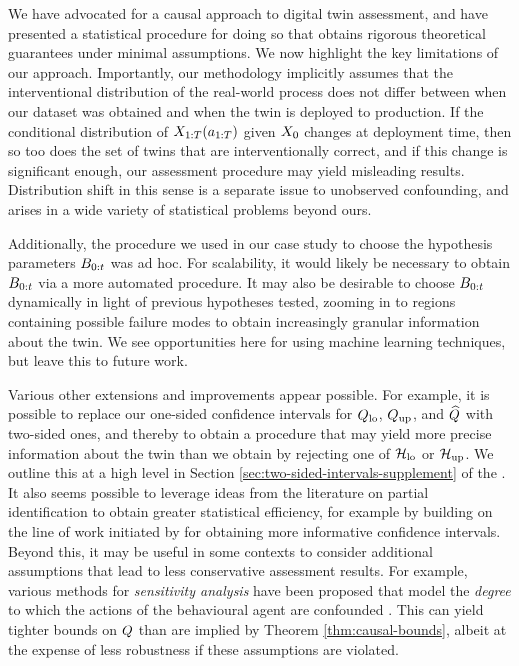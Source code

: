 We have advocated for a causal approach to digital twin assessment, and have presented a statistical procedure for doing so that obtains rigorous theoretical guarantees under minimal assumptions.
We now highlight the key limitations of our approach.
Importantly, our methodology implicitly assumes that the interventional distribution of the real-world process does not differ between when our dataset was obtained and when the twin is deployed to production. %
%
If the conditional distribution of $X_{1:T}(a_{1:T})$ given $X_0$ changes at deployment time, then so too does the set of twins that are interventionally correct, and if this change is significant enough, our assessment procedure may yield misleading results.
%
%
%
%
%
%
Distribution shift in this sense is a separate issue to unobserved confounding, and arises in a wide variety of statistical problems beyond ours.

Additionally, the procedure we used in our case study to choose the hypothesis parameters $B_{0:t}$ was ad hoc.
For scalability, it would likely be necessary to obtain $B_{0:t}$ via a more automated procedure.
It may also be desirable to choose $B_{0:t}$ dynamically in light of previous hypotheses tested, zooming in to regions containing possible failure modes to obtain increasingly granular information about the twin.
We see opportunities here for using machine learning techniques, but leave this to future work.

%


%
%


%
%
%
%

Various other extensions and improvements appear possible.
For example, it is possible to replace our one-sided confidence intervals for $Q_{\mathrm{lo}}$, $Q_{\mathrm{up}}$, and $\widehat{Q}$ with two-sided ones, and thereby to obtain a procedure that may yield more precise information about the twin than we obtain by rejecting one of $\mathcal{H}_{\mathrm{lo}}$ or $\mathcal{H}_{\mathrm{up}}$.
We outline this at a high level in Section \ref{sec:two-sided-intervals-supplement} of the \AppendixName.
It also seems possible to leverage ideas from the literature on partial identification \cite{manski2003partial} to obtain greater statistical efficiency, for example by building on the line of work initiated by \cite{imbens2004confidence} for obtaining more informative confidence intervals.
%
%
Beyond this, it may be useful in some contexts to consider additional assumptions that lead to less conservative assessment results.
For example, various methods for \emph{sensitivity analysis} have been proposed that model the \emph{degree} to which the actions of the behavioural agent are confounded \cite{rosenbaum2002observational,tan2006distributional,yadlowsky2022bounds}.
This can yield tighter bounds on $Q$ than are implied by Theorem \ref{thm:causal-bounds}, albeit at the expense of less robustness if these assumptions are violated.


%
%
%
%
%
%
%
%
%

%